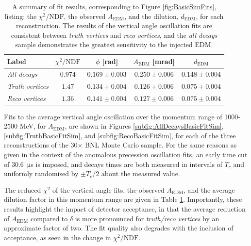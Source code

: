 \begin{table}[b!]
\centering{}
\begin{tabular}{l|cccc}
\hline
\hline
Label & $\chi^{2}/\text{NDF}$ & $\phi$ [rad] & $A_{\text{EDM}}$ [mrad] & $d_{\text{EDM}}$ \\
\hline
\textit{All decays}     & $0.974$ & $0.169\pm0.003$ & $0.250\pm0.006$ & $0.148\pm0.004$ \\
\textit{Truth vertices} & $1.47$  & $0.134\pm0.004$ & $0.126\pm0.006$ & $0.075\pm0.004$ \\
\textit{Reco vertices}  & $1.36$  & $0.141\pm0.004$ & $0.127\pm0.006$ & $0.075\pm0.004$ \\
\hline
\hline
\end{tabular}
\caption{A summary of fit results, corresponding to Figure \ref{fig:BasicSimFits}, listing: the $\chi^{2}/\text{NDF}$, the observed $A_{\text{EDM}}$, and the dilution, $d_{\text{EDM}}$, for each reconstruction. The results of the vertical angle oscillation fits are consistent between \textit{truth vertices} and \textit{reco vertices}, and the \textit{all decays} sample demonstrates the greatest sensitivity to the injected EDM.} 
\label{tbl:BasicSimFits}
\end{table}

Fits to the average vertical angle oscillation over the momentum range of 1000-2500 MeV, for $A_{\text{EDM}}$, are shown in Figures \ref{subfig:AllDecaysBasicFitSim}, \ref{subfig:TruthBasicFitSim}, and \ref{subfig:RecoBasicFitSim}, for each of the three reconstructions of the 30$\times$ BNL Monte Carlo sample. For the same reasons as given in the context of the anomalous precession oscillation fits, an early time cut of \SI{30.6}{\micro\second} is imposed, and decays times are both measured in intervals of $T_{c}$ and uniformly randomised by $\pm T_{c}/2$ about the measured value. %

The reduced $\chi^{2}$ of the vertical angle fits, the observed $A_{\text{EDM}}$, and the average dilution factor in this momentum range are given in Table \ref{tbl:BasicSimFits}. Importantly, these results highlight the impact of detector acceptance, in that the average reduction of $A_{\text{EDM}}$ compared to $\delta$ is more pronounced for \textit{truth/reco vertices} by an approximate factor of two. The fit quality also degrades with the inclusion of acceptance, as seen in the change in $\chi^{2}/\text{NDF}$.

